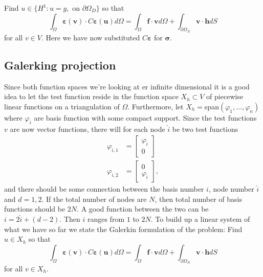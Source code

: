 \documentclass[paper=a4, fontsize=11pt]{scrartcl} %
\begin{document}
Find $u \in \{H^1 : u=g,$ on $\partial\Omega_D\}$ so that
\begin{equation}
\label{VarForm}
\int_{\Omega}\boldsymbol{\varepsilon}(\boldsymbol{v})\cdot C\boldsymbol{\varepsilon}(\boldsymbol{u})d\Omega = \int_{\Omega}\boldsymbol{f}\cdot \boldsymbol{v} d\Omega + \int_{\partial \Omega_N}\boldsymbol{v}\cdot\boldsymbol{h}dS
\end{equation}
for all $v\in V$. Here we have now substituted $C\boldsymbol{\varepsilon}$ for $\boldsymbol{\sigma}$.

\subsection*{Galerking projection}
Since both function spaces we're looking at er infinite dimensional it is a good idea to let the test function reside in the function space $X_h \subset V$ of piecewise linear functions on a triangulation of $\Omega$. Furthermore, let $X_h =$span$(\varphi_1,\ldots,\varphi_n)$ where $\varphi_i$ are basis function with some compact support. Since the test functions $v$ are now vector functions, there will for each node $\hat{i}$ be two test functions
\begin{align*}
\varphi_{\hat{i},1} &= \begin{bmatrix}
\varphi_{\hat{i}} \\ 0
\end{bmatrix} \\
\varphi_{\hat{i},2} &= \begin{bmatrix}
0 \\ \varphi_{\hat{i}}
\end{bmatrix},
\end{align*}
and there should be some connection between the basis number $i$, node number $\hat{i}$ and $d=1,2$. If the total number of nodes are $N$, then total number of basis functions should be $2N$. A good function between the two can be $i = 2\hat{i}+ (d-2)$. Then $i$ ranges from $1$ to $2N$. To build up a linear system of what we have so far we state the Galerkin formulation of the problem: Find $u \in X_h$ so that
\begin{equation}
\label{Galerkin}
\int_{\Omega}\boldsymbol{\varepsilon}(\boldsymbol{v})\cdot C\boldsymbol{\varepsilon}(\boldsymbol{u})d\Omega = \int_{\Omega}\boldsymbol{f}\cdot \boldsymbol{v} d\Omega + \int_{\partial \Omega_N}\boldsymbol{v}\cdot\boldsymbol{h}dS
\end{equation}
for all $v\in X_h$.
\end{document}
